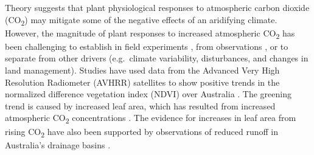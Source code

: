 \documentclass[gc, manuscript]{copernicus}
\begin{document}
Theory suggests that plant physiological responses to atmospheric carbon
dioxide (CO\textsubscript{2}) may mitigate some of the negative effects
of an aridifying climate. However, the magnitude of plant responses to
increased atmospheric CO\textsubscript{2} has been challenging to
establish in field experiments \citep{jiangFateCarbonMature2020b}, from
observations
\citep{zhuGreeningEarthIts2016a, walkerIntegratingEvidenceTerrestrial2020b},
or to separate from other drivers (e.g.~climate variability,
disturbances, and changes in land management). Studies have used data
from the Advanced Very High Resolution Radiometer (AVHRR) satellites to
show positive trends in the normalized difference vegetation index
(NDVI) over Australia
\citep{donohueClimaterelatedTrendsAustralian2009c}. The greening trend
is caused by increased leaf area, which has resulted from increased
atmospheric CO\textsubscript{2} concentrations
\citep{donohueClimaterelatedTrendsAustralian2009c, ukkolaReducedStreamflowWaterstressed2016b}.
The evidence for increases in leaf area from rising CO\textsubscript{2}
have also been supported by observations of reduced runoff in
Australia's drainage basins
\citep{trancosoCOVegetationFeedbacks2017b, ukkolaReducedStreamflowWaterstressed2016b}.
\end{document}
